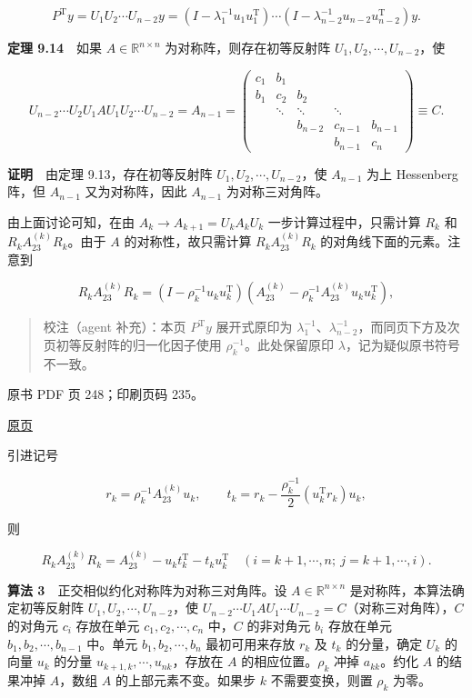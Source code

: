 \[
P^{\mathrm T}y=U_1U_2\cdots U_{n-2}y
=(I-\lambda_1^{-1}u_1u_1^{\mathrm T})\cdots(I-\lambda_{n-2}^{-1}u_{n-2}u_{n-2}^{\mathrm T})y.
\]

\textbf{定理 9.14}　如果 \(A\in\mathbb R^{n\times n}\) 为对称阵，则存在初等反射阵 \(U_1,U_2,\cdots,U_{n-2}\)，使

\[
U_{n-2}\cdots U_2U_1AU_1U_2\cdots U_{n-2}=A_{n-1}
=\begin{pmatrix}
c_1&b_1&&&\\
b_1&c_2&b_2&&\\
&\ddots&\ddots&\ddots&\\
&&b_{n-2}&c_{n-1}&b_{n-1}\\
&&&b_{n-1}&c_n
\end{pmatrix}\equiv C.
\]

\textbf{证明}　由定理 9.13，存在初等反射阵 \(U_1,U_2,\cdots,U_{n-2}\)，使 \(A_{n-1}\) 为上 Hessenberg 阵，但 \(A_{n-1}\) 又为对称阵，因此 \(A_{n-1}\) 为对称三对角阵。

由上面讨论可知，在由 \(A_k\to A_{k+1}=U_kA_kU_k\) 一步计算过程中，只需计算 \(R_k\) 和 \(R_kA_{23}^{(k)}R_k\)。由于 \(A\) 的对称性，故只需计算 \(R_kA_{23}^{(k)}R_k\) 的对角线下面的元素。注意到

\[
R_kA_{23}^{(k)}R_k=(I-\rho_k^{-1}u_ku_k^{\mathrm T})(A_{23}^{(k)}-\rho_k^{-1}A_{23}^{(k)}u_ku_k^{\mathrm T}),
\]

\begin{quote}
校注（agent 补充）：本页 \(P^{\mathrm T}y\) 展开式原印为 \(\lambda_1^{-1}\)、\(\lambda_{n-2}^{-1}\)，而同页下方及次页初等反射阵的归一化因子使用 \(\rho_k^{-1}\)。此处保留原印 \(\lambda\)，记为疑似原书符号不一致。
\end{quote}

\clearpage

原书 PDF 页 248；印刷页码 235。

\href{source-images/pdf-248.jpeg}{原页}

引进记号

\[
r_k=\rho_k^{-1}A_{23}^{(k)}u_k,\qquad
 t_k=r_k-\frac{\rho_k^{-1}}2(u_k^{\mathrm T}r_k)u_k,
\]

则

\[
R_kA_{23}^{(k)}R_k=A_{23}^{(k)}-u_kt_k^{\mathrm T}-t_ku_k^{\mathrm T}
\quad(i=k+1,\cdots,n;\ j=k+1,\cdots,i).
\]

\textbf{算法 3}　正交相似约化对称阵为对称三对角阵。设 \(A\in\mathbb R^{n\times n}\) 是对称阵，本算法确定初等反射阵 \(U_1,U_2,\cdots,U_{n-2}\)，使 \(U_{n-2}\cdots U_1AU_1\cdots U_{n-2}=C\)（对称三对角阵），\(C\) 的对角元 \(c_i\) 存放在单元 \(c_1,c_2,\cdots,c_n\) 中，\(C\) 的非对角元 \(b_i\) 存放在单元 \(b_1,b_2,\cdots,b_{n-1}\) 中。单元 \(b_1,b_2,\cdots,b_n\) 最初可用来存放 \(r_k\) 及 \(t_k\) 的分量，确定 \(U_k\) 的向量 \(u_k\) 的分量 \(u_{k+1,k},\cdots,u_{nk}\)，存放在 \(A\) 的相应位置。\(\rho_k\) 冲掉 \(a_{kk}\)。约化 \(A\) 的结果冲掉 \(A\)，数组 \(A\) 的上部元素不变。如果步 \(k\) 不需要变换，则置 \(\rho_k\) 为零。

